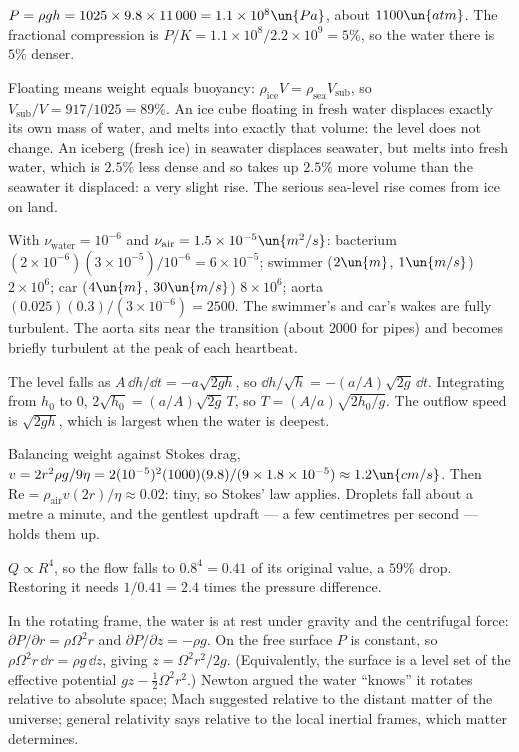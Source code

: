 
 $P = \rho gh = 1025\times9.8\times11\,000 = 1.1\times10^8\un{Pa}$, about $1100\un{atm}$. The fractional compression is $P/K = 1.1\times10^8/2.2\times10^9 = 5\%$, so the water there is $5\%$ denser.

 Floating means weight equals buoyancy: $\rho_{\text{ice}}V = \rho_{\text{sea}}V_{\text{sub}}$, so $V_{\text{sub}}/V = 917/1025 = 89\%$. An ice cube floating in fresh water displaces exactly its own mass of water, and melts into exactly that volume: the level does not change. An iceberg (fresh ice) in seawater displaces seawater, but melts into fresh water, which is $2.5\%$ less dense and so takes up $2.5\%$ more volume than the seawater it displaced: a very slight rise. The serious sea-level rise comes from ice on land.

 With $\nu_{\text{water}} = 10^{-6}$ and $\nu_{\text{air}} = 1.5\times10^{-5}\un{m^2/s}$: bacterium $(2\times10^{-6})(3\times10^{-5})/10^{-6} = 6\times10^{-5}$; swimmer ($2\un{m}$, $1\un{m/s}$) $2\times10^6$; car ($4\un{m}$, $30\un{m/s}$) $8\times10^6$; aorta $(0.025)(0.3)/(3\times10^{-6}) = 2500$. The swimmer's and car's wakes are fully turbulent. The aorta sits near the transition (about $2000$ for pipes) and becomes briefly turbulent at the peak of each heartbeat.

 The level falls as $A\,\dd h/\dd t = -a\sqrt{2gh}$, so $\dd h/\sqrt h = -(a/A)\sqrt{2g}\,\dd t$. Integrating from $h_0$ to $0$, $2\sqrt{h_0} = (a/A)\sqrt{2g}\,T$, so $T = (A/a)\sqrt{2h_0/g}$. The outflow speed is $\sqrt{2gh}$, which is largest when the water is deepest.

 Balancing weight against Stokes drag, $v = 2r^2\rho g/9\eta = 2(10^{-5})^2(1000)(9.8)/(9\times1.8\times10^{-5})\approx1.2\un{cm/s}$. Then $\mathrm{Re} = \rho_{\text{air}}v(2r)/\eta\approx0.02$: tiny, so Stokes' law applies. Droplets fall about a metre a minute, and the gentlest updraft --- a few centimetres per second --- holds them up.

 $Q\propto R^4$, so the flow falls to $0.8^4 = 0.41$ of its original value, a $59\%$ drop. Restoring it needs $1/0.41 = 2.4$ times the pressure difference.

 In the rotating frame, the water is at rest under gravity and the centrifugal force: $\partial P/\partial r = \rho\Omega^2r$ and $\partial P/\partial z = -\rho g$. On the free surface $P$ is constant, so $\rho\Omega^2r\,\dd r = \rho g\,\dd z$, giving $z = \Omega^2r^2/2g$. (Equivalently, the surface is a level set of the effective potential $gz - \tfrac12\Omega^2r^2$.) Newton argued the water ``knows'' it rotates relative to absolute space; Mach suggested relative to the distant matter of the universe; general relativity says relative to the local inertial frames, which matter determines.

